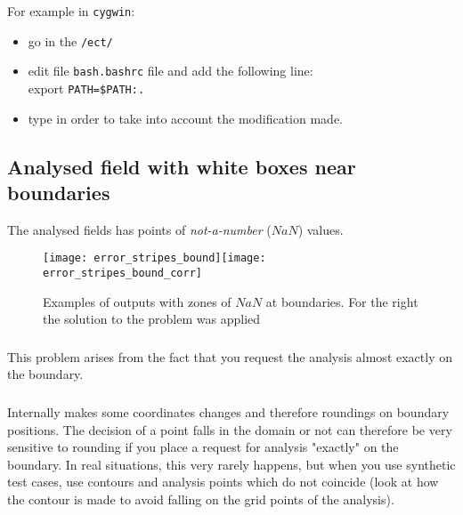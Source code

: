 For example in \texttt{cygwin}:\\
\begin{itemize}
\item go in the \texttt{/ect/}
\item edit file \texttt{bash.bashrc} file
and add the following line:\\
export \texttt{PATH=\$PATH:.}
\item type  in order to take into account the modification made.
\end{itemize}



\subsection{Analysed field with white boxes near boundaries}

The analysed fields has points of \textit{not-a-number} ($NaN$) values.

\begin{figure}[htpb]
\centering
\texttt{[image: error\_stripes\_bound]}\texttt{[image: error\_stripes\_bound\_corr]}
\caption[Examples of \diva outputs with zones of $NaN$ at boundaries.]{Examples of \diva outputs with zones of $NaN$ at boundaries. For the right the solution to the problem was applied \label{fig:error_stripes}}
\end{figure}

\subsubsection{\question}

This problem arises from the fact that you request the analysis almost exactly on the boundary.



\subsubsection{\answer}

Internally \diva makes some coordinates changes and therefore roundings on boundary positions. The decision of a point falls in the domain or not can therefore be very sensitive
to rounding if you place a request for analysis "exactly" on the boundary. In real situations, this very rarely happens, but when you use synthetic test cases, use contours and analysis points which do not coincide (look at  how the contour is made to avoid falling on the grid points of the analysis).



